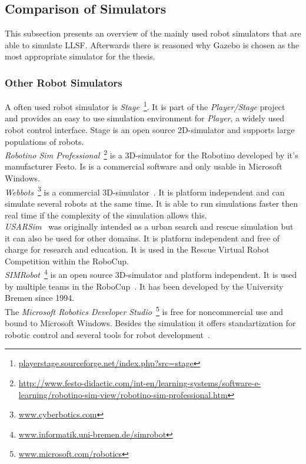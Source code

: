 \documentclass[11pt,a4paper,titlepage]{article}
\begin{document}
\subsection{Comparison of Simulators}
This subsection presents an overview of the mainly used robot simulators that are able to simulate LLSF. Afterwards there is reasoned why Gazebo is chosen as the most appropriate simulator for the thesis.
\subsubsection{Other Robot Simulators}
A often used robot simulator is \textit{Stage}~\footnote{\url{playerstage.sourceforge.net/index.php?src=stage}}. It is part of the \textit{Player/Stage} project~\cite{PlayerStage} and provides an easy to use simulation environment for \textit{Player}, a widely used robot control interface. Stage is an open source 2D-simulator and supports large populations of robots.\\
\textit{Robotino Sim Professional}~\footnote{\url{http://www.festo-didactic.com/int-en/learning-systems/software-e-learning/robotino-sim-view/robotino-sim-professional.htm}} is a 3D-simulator for the Robotino developed by it's manufacturer Festo. Is is a commercial software and only usable in Microsoft Windows.\\
\textit{Webbots}~\footnote{\url{www.cyberbotics.com}} is a commercial 3D-simulator~\cite{Webbots}. It is platform independent and can simulate several robots at the same time. It is able to run simulations faster then real time if the complexity of the simulation allows this.\\
\textit{USARSim}~\cite{USARSim} was originally intended as a urban search and rescue simulation but it can also be used for other domains. It is platform independent and free of charge for research and education. It is used in the Rescue Virtual Robot Competition within the RoboCup.\\
\textit{SIMRobot}~\footnote{\url{www.informatik.uni-bremen.de/simrobot}} is an open source 3D-simulator and platform independent. It is used by multiple teams in the RoboCup~\cite{SIMRobot}. It has been developed by the University Bremen since 1994.\\
The \textit{Microsoft Robotics Developer Studio}~\footnote{\url{www.microsoft.com/robotics}} is free for noncommercial use and bound to Microsoft Windows. Besides the simulation it offers standartization for robotic control and several tools for robot development~\cite{MicrosoftRoboticsStudio}.
\end{document}
